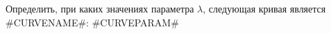 Определить, при каких значениях параметра $\lambda$, следующая кривая является #CURVENAME#:
#CURVEPARAM#